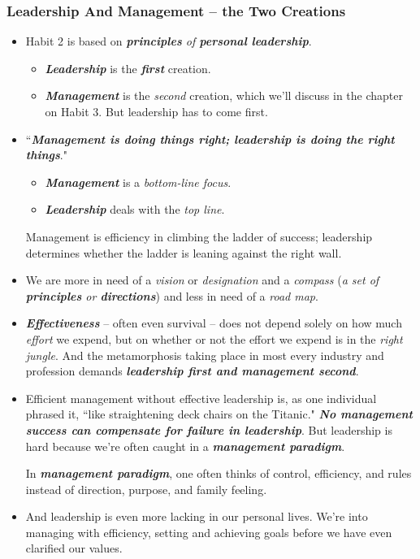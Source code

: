 \documentclass[11pt]{article}
\begin{document}
\subsubsection{Leadership And Management -- the Two Creations}
\begin{itemize}
\item Habit 2 is based on \emph{\textbf{principles} of \textbf{personal leadership}}.
\begin{itemize}
\item \emph{\textbf{Leadership}} is the \emph{\textbf{first}} creation.
\item \emph{\textbf{Management}} is the \emph{second} creation, which we'll discuss in the chapter on Habit 3. But leadership has to come first.
\end{itemize}

\item ``\emph{\textbf{Management is doing things right; leadership is doing the right things}}."
\begin{itemize}
\item \emph{\textbf{Management}} is a \emph{bottom-line focus}. 
\item \emph{\textbf{Leadership}} deals with the \emph{top line}.
\end{itemize} 
Management is efficiency in climbing the ladder of success; leadership determines whether the ladder is leaning against the right wall.

\item We are more in need of a \emph{vision} or \emph{designation} and a \emph{compass} (\emph{a set of \textbf{principles} or \textbf{directions}}) and less in need of a \emph{road map}. 

\item \emph{\textbf{Effectiveness}} -- often even survival -- does not depend solely on how much \emph{effort} we expend, but on whether or not the effort we expend is in the \emph{right jungle}. And the metamorphosis taking place in most every industry and profession demands \emph{\textbf{leadership first and management second}}.

\item Efficient management without effective leadership is, as one individual phrased it, ``like straightening deck chairs on the Titanic." 
\emph{\textbf{No management success can compensate for failure in leadership}}. But leadership is hard because we're often caught in a \emph{\textbf{management paradigm}}.

In \emph{\textbf{management paradigm}}, one often thinks of control, efficiency, and rules instead of direction, purpose, and family feeling.

\item And leadership is even more lacking in our personal lives. We're into managing with efficiency, setting and achieving goals before we have even clarified our values.
\end{itemize}
\end{document}
